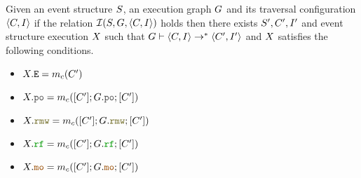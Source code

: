 \documentclass[12pt]{article}
\begin{document}
\begin{lemma}
  \label{lemma:3}
  Given an event structure $S$, an \imm execution graph $G$ 
  and its traversal configuration $\langle C, I \rangle$
  if the relation $\mathcal{I}(S, G, \langle C, I \rangle)$ holds
  then there exists $S', C', I'$ and event structure execution $X$ such that
  $G \vdash \langle C, I \rangle \rightarrow^* \langle C', I' \rangle$
  and $X$ satisfies the following conditions.
  \begin{itemize}
  \item $X.{\mathtt{E}} = m_{c}(C')$
  \item $\lX.\lPO = \lMC([\lC'];\lG.\lPO;[\lC'])$
  \item $\lX.\lRMW = \lMC([\lC'];\lG.\lRMW;[\lC'])$
  \item $\lX.\lRF = \lMC([\lC'];\lG.\lRF;[\lC'])$
  \item $\lX.\lMO = \lMC([\lC'];\lG.\lMO;[\lC'])$    
  \end{itemize}
\end{lemma}

\setmonofont[Mapping=tex-text]{CMU Typewriter Text}


\end{document}
